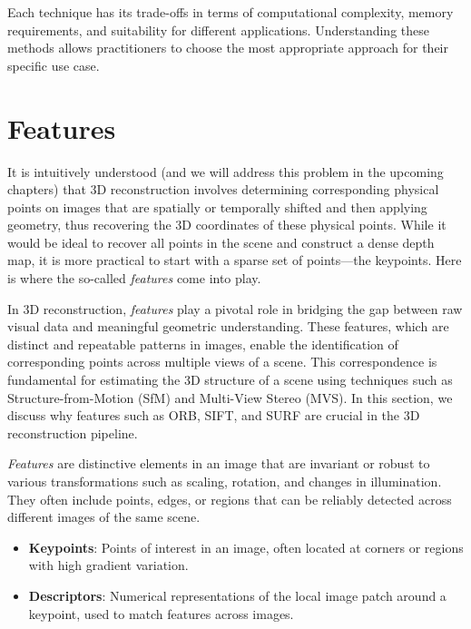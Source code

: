 \documentclass[11pt]{book}
\begin{document}
Each technique has its trade-offs in terms of computational complexity, memory requirements, and suitability for different applications. Understanding these methods allows practitioners to choose the most appropriate approach for their specific use case.







\chapter{Features}


It is intuitively understood (and we will address this problem in the upcoming chapters) that 3D reconstruction involves determining corresponding physical points on images that are spatially or temporally shifted and then applying geometry, thus recovering the 3D coordinates of these physical points. While it would be ideal to recover all points in the scene and construct a dense depth map, it is more practical to start with a sparse set of points—the keypoints. Here is where the so-called {\it features} come into play.

In 3D reconstruction, {\it features} play a pivotal role in bridging the gap between raw visual data and meaningful geometric understanding. These features, which are distinct and repeatable patterns in images, enable the identification of corresponding points across multiple views of a scene. This correspondence is fundamental for estimating the 3D structure of a scene using techniques such as Structure-from-Motion (SfM) and Multi-View Stereo (MVS). In this section, we discuss why features such as ORB, SIFT, and SURF are crucial in the 3D reconstruction pipeline.

{\it Features} are distinctive elements in an image that are invariant or robust to various transformations such as scaling, rotation, and changes in illumination. They often include points, edges, or regions that can be reliably detected across different images of the same scene. 

\begin{itemize}
\item \textbf{Keypoints}: Points of interest in an image, often located at corners or regions with high gradient variation.
\item \textbf{Descriptors}: Numerical representations of the local image patch around a keypoint, used to match features across images.
\end{itemize}
\end{document}
